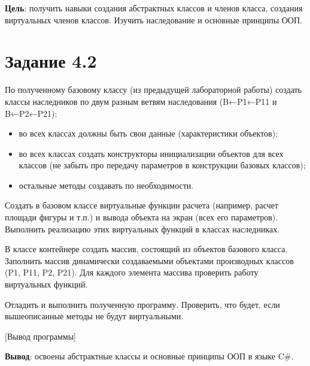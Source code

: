 \documentclass{bsuir}
\newcommand{\csharp}{C{\liberationrm\#}}
\begin{document}
    \maketitle

    \textbf{Цель}: получить навыки создания абстрактных классов и членов класса,
    создания виртуальных членов классов. Изучить наследование и основные принципы
    ООП.

    \section*{Задание 4.2}

    По полученному базовому классу (из предыдущей лабораторной работы) создать
    классы наследников по двум разным ветвям наследования (B←P1←P11 и B←P2←P21):
    
    \begin{itemize}
        \item во всех классах должны быть свои данные (характеристики объектов);
        \item во всех классах создать конструкторы инициализации объектов для
              всех классов (не забыть про передачу параметров в конструкции
              базовых классов);
        \item остальные методы создавать по необходимости.
    \end{itemize}

    Создать в базовом классе виртуальные функции расчета (например, расчет
    площади фигуры и т.п.) и вывода объекта на экран (всех его параметров).
    Выполнить реализацию этих виртуальных функций в классах наследниках.
    
    В классе контейнере создать массив, состоящий из объектов базового класса.
    Заполнить массив динамически создаваемыми объектами производных классов (P1,
    P11, P2, P21). Для каждого элемента массива проверить работу виртуальных
    функций.
    
    Отладить и выполнить полученную программу. Проверить, что будет, если
    вышеописанные методы не будут виртуальными.


    [Вывод программы]

    \textbf{Вывод}: освоены абстрактные классы и основные принципы ООП в языке
    \csharp.
\end{document}
